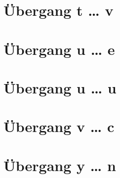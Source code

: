 \documentclass[a4paper,landscape]{article}
\begin{document}
\hspace*{-1ex}
\newpage

\section{Übergang t … v }

\hspace*{-1ex}
\newpage

\section{Übergang u … e }

\hspace*{-1ex}
\newpage

\section{Übergang u … u }

\hspace*{-1ex}
\newpage

\section{Übergang v … c }

\hspace*{-1ex}
\newpage

\section{Übergang y … n }

\hspace*{-1ex}
\newpage
\end{document}
